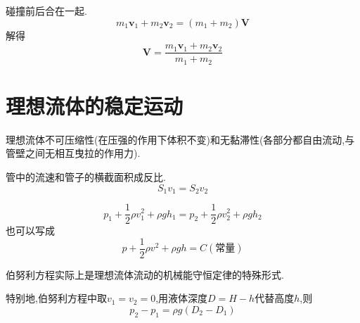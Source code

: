 \par {}碰撞前后合在一起.
\begin{equation}
m_1\bm{v}_1+m_2\bm{v}_2=(m_1+m_2)\bm{V}
\end{equation}
解得
\begin{equation}
\bm{V}=\frac{m_1\bm{v}_1+m_2\bm{v}_2}{m_1+m_2}
\end{equation}

\section{理想流体的稳定运动}
理想流体不可压缩性(在压强的作用下体积不变)和无黏滞性(各部分都自由流动,与管壁之间无相互曳拉的作用力).\jg\jg
\par {}\jg
\par 管中的流速和管子的横截面积成反比.
\begin{equation}
S_1v_1=S_2v_2
\end{equation}

\par {}
\begin{equation}
p_1+\frac{1}{2}\rho v_1^2+\rho gh_1=p_2+\frac{1}{2}\rho v_2^2+\rho gh_2
\end{equation}
也可以写成
\begin{equation}
p+\frac{1}{2}\rho v^2+\rho gh=C(\mbox{常量})
\end{equation}
\par 伯努利方程实际上是理想流体流动的机械能守恒定律的特殊形式.\jg\jg
\par {}特别地,伯努利方程中取$v_1=v_2=0$,用液体深度$D=H-h$代替高度$h$,则
\begin{equation}
p_2-p_1=\rho g (D_2-D_1)
\end{equation}


